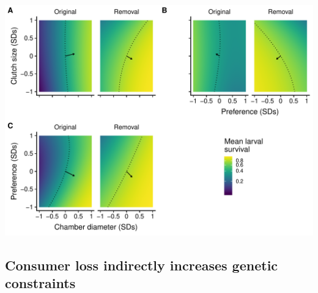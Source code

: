 \documentclass[11pt,]{article}
\let\origfigure\figure
\let\endorigfigure\endfigure
\renewenvironment{figure}[1][2] {
    \expandafter\origfigure\expandafter[H]
} {
    \endorigfigure
}
\begin{document}
\begin{figure}
\centering
\includegraphics{../analyses/MV_landscapes.pdf}
\caption{\label{fig:MV_Landscape}Two dimensional view of adaptive
landscapes of gall midge phenotypes in the original food web and with
the removal of larval parasitoids. Each panel corresponds to a different
combination of phenotypic traits: clutch size and chamber diameter (A);
clutch size and oviposition preference (B); oviposition preference and
chamber diameter (C). Arrows represent mean estimates of directional
selection gradients, while contours represent predicted larval survival
of the mean phenotype in each food-web treatment. Notice that arrows
point more toward a corner of the adaptive landscape for each
combination of traits with the removal of larval parasitoids compared to
the original food web. This indicates that the loss of consumers more
strongly favored a specific combination of traits. Note that mean larval
survival is plotted on a natural log scale to reflect the mathematical
definition of the adaptive landscape.}
\end{figure}

\subsection{Consumer loss indirectly increases genetic
constraints}\label{consumer-loss-indirectly-increases-genetic-constraints}
\end{document}
